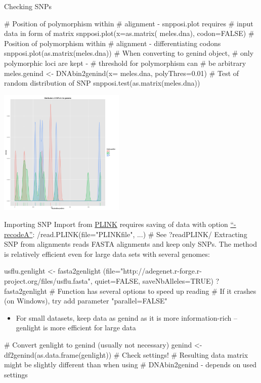 \documentclass[compress, ucs, xelatex, 11pt, xcolor=svgnames,
  hyperref={
    bookmarks=true,
    unicode=true,
    colorlinks=true,
    pdftitle={Molecular data in R},
    plainpages=false,
    pdfauthor={Vojtech Zeisek},
    pdfsubject={Course about phylogeny and evolution in R},
    pdfcreator={XeLaTeX},
    pdfkeywords={R, evolution, phylogeny, molecular data},
    linkcolor=Tomato,
    anchorcolor=SaddleBrown,
    citecolor=Goldenrod,
    filecolor=DarkMagenta,
    menucolor=Sienna,
    urlcolor=DarkTurquoise,
    pdftex},
  url={hyphens, lowtilde} %
  ]{beamer}
\begin{document}
\begin{frame}[fragile]{Checking SNPs}
\begin{multicols}{2}
  \begin{spluscode}
    # Position of polymorphism within
    # alignment - snpposi.plot requires
    # input data in form of matrix
    snpposi.plot(x=as.matrix(
      meles.dna), codon=FALSE)
    # Position of polymorphism within
    # alignment - differentiating codons
    snpposi.plot(as.matrix(meles.dna))
    # When converting to genind object,
    # only polymorphic loci are kept - 
    # threshold for polymorphism can
    # be arbitrary
    meles.genind <- DNAbin2genind(x=
      meles.dna, polyThres=0.01)
    # Test of random distribution of SNP
    snpposi.test(as.matrix(meles.dna))
  \end{spluscode}
  \begin{flushright}
    \includegraphics[height=6cm]{snpposi.png}
  \end{flushright}
\end{multicols}
\end{frame}

\begin{frame}[fragile]{Importing SNP}
  Import from \href{http://pngu.mgh.harvard.edu/~purcell/plink/}{PLINK} requires saving of data with option \href{http://pngu.mgh.harvard.edu/~purcell/plink/dataman.shtml#recode}{``-recodeA''}:
  \splus/read.PLINK(file="PLINKfile", ...) # See ?readPLINK/
  Extracting SNP from alignments reads FASTA alignments and keep only SNPs. The method is relatively efficient even for large data sets with several genomes:
  \begin{spluscode}
    usflu.genlight <- fasta2genlight
      (file="http://adegenet.r-forge.r-project.org/files/usflu.fasta",
      quiet=FALSE, saveNbAlleles=TRUE)
    ?fasta2genlight # Function has several options to speed up reading
    # If it crashes (on Windows), try add parameter "parallel=FALSE"
  \end{spluscode}
  \begin{itemize}
  \item For small datasets, keep data as genind as it is more information-rich -- genlight is more efficient for large data
  \end{itemize}
  \begin{spluscode}
    # Convert genlight to genind (usually not necessary)
    genind <- df2genind(as.data.frame(genlight)) # Check settings!
    # Resulting data matrix might be slightly different than when using
    # DNAbin2genind - depends on used settings
  \end{spluscode}
\end{frame}
\end{document}
